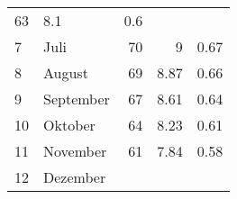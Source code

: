 \begin{longtable}{lXrrr}
       \num{63} &
       \num[round-mode=places,round-precision=2]{8.1} &
         \num[round-mode=places,round-precision=2]{0.6} \\

     7 &
     \multicolumn{1}{X}{ Juli   } &


       \num{70} &
       \num[round-mode=places,round-precision=2]{9} &
         \num[round-mode=places,round-precision=2]{0.67} \\

     8 &
     \multicolumn{1}{X}{ August   } &


       \num{69} &
       \num[round-mode=places,round-precision=2]{8.87} &
         \num[round-mode=places,round-precision=2]{0.66} \\

     9 &
     \multicolumn{1}{X}{ September   } &


       \num{67} &
       \num[round-mode=places,round-precision=2]{8.61} &
         \num[round-mode=places,round-precision=2]{0.64} \\

     10 &
     \multicolumn{1}{X}{ Oktober   } &


       \num{64} &
       \num[round-mode=places,round-precision=2]{8.23} &
         \num[round-mode=places,round-precision=2]{0.61} \\

     11 &
     \multicolumn{1}{X}{ November   } &


       \num{61} &
       \num[round-mode=places,round-precision=2]{7.84} &
         \num[round-mode=places,round-precision=2]{0.58} \\

     12 &
     \multicolumn{1}{X}{ Dezember   } &



\end{longtable}
